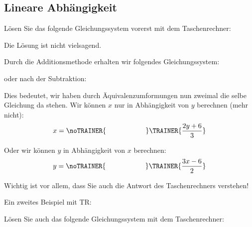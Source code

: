 \subsection{Lineare Abhängigkeit}

Lösen Sie das folgende Gleichungssystem vorerst mit dem
Taschenrechner:


Die Lösung ist nicht vielsagend.

Durch die Additionsmethode erhalten wir folgendes Gleichungssystem:


oder nach der Subtraktion:


Dies bedeutet, wir haben durch Äquivalenzumformungen nun zweimal die selbe
Gleichung da stehen. Wir können $x$ nur in Abhängigkeit von $y$
berechnen (mehr nicht):
$$x=\noTRAINER{\hspace{20mm}}\TRAINER{\frac{2y+6}{3}}$$

Oder wir können $y$ in Abhängigkeit von $x$ berechnen:
$$y=\noTRAINER{\hspace{20mm}}\TRAINER{\frac{3x-6}{2}}$$

Wichtig ist vor allem, dass Sie auch die Antwort des Taschenrechners verstehen!
\newpage

Ein zweites Beispiel mit TR:

Lösen Sie auch das folgende Gleichungssystem mit dem Taschenrechner:


